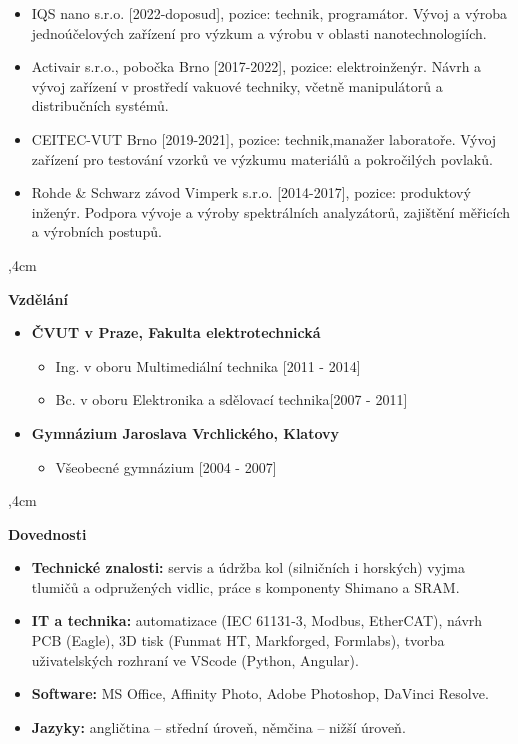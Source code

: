 \documentclass[10pt]{article}
\begin{document}
\begin{itemize}
\item IQS nano s.r.o. [2022-doposud], pozice: technik, programátor. Vývoj a výroba jednoúčelových zařízení pro výzkum a výrobu v oblasti nanotechnologiích.
\item Activair s.r.o., pobočka Brno [2017-2022], pozice: elektroinženýr. Návrh a vývoj zařízení v prostředí vakuové techniky, včetně manipulátorů a distribučních systémů.
\item CEITEC-VUT Brno [2019-2021], pozice: technik,manažer laboratoře. Vývoj zařízení pro testování vzorků ve výzkumu materiálů a pokročilých povlaků.
\item Rohde \& Schwarz závod Vimperk s.r.o. [2014-2017], pozice: produktový inženýr. Podpora vývoje a výroby spektrálních analyzátorů, zajištění měřicích a výrobních postupů. 
\end{itemize}

\noindent\hrulefill
{},4cm


\textbf{Vzdělání}

\begin{itemize}
    \item [\faGraduationCap]\textbf{ČVUT v Praze, Fakulta elektrotechnická }
    \begin{itemize}
        \item Ing. v oboru Multimediální technika [2011 - 2014]
        \item Bc. v oboru Elektronika a sdělovací technika[2007 - 2011]
    \end{itemize}
    \item[\faGraduationCap] \textbf{Gymnázium Jaroslava Vrchlického, Klatovy }
    \begin{itemize}
        \item Všeobecné gymnázium [2004 - 2007]
    \end{itemize}
\end{itemize}

\noindent\hrulefill
{},4cm

\clearpage

\textbf{Dovednosti}

\begin{itemize}
    \item \textbf{Technické znalosti:} servis a údržba kol (silničních i horských) vyjma tlumičů a odpružených vidlic, práce s komponenty Shimano a SRAM. 
    \item \textbf{IT a technika:} automatizace (IEC 61131-3, Modbus, EtherCAT), návrh PCB (Eagle), 3D tisk (Funmat HT, Markforged, Formlabs), tvorba uživatelských rozhraní ve VScode (Python, Angular).
    \item \textbf{Software:} MS Office, Affinity Photo, Adobe Photoshop, DaVinci Resolve.
    \item \textbf{Jazyky:} angličtina – střední úroveň, němčina – nižší úroveň.
\end{itemize}
\end{document}
